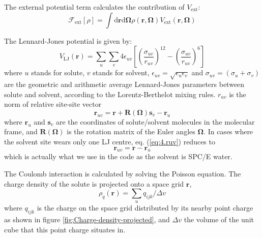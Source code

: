 The external potential term calculates the contribution of $V_{\mathrm{ext}}$:
\begin{equation}
\mathcal{F}_{\mathrm{ext}}[\rho]=\int\mathrm{d}\mathbf{r}\mathrm{d}\mathbf{\mathbf{\Omega}}\rho(\mathbf{r},\mathbf{\mathbf{\mathbf{\mathbf{\Omega}}}})V_{\mathrm{ext}}(\mathbf{r},\mathbf{\mathbf{\mathbf{\mathbf{\Omega}}}})
\end{equation}

The Lennard-Jones potential is given by:
\begin{equation}
V_{\mathrm{LJ}}(\mathbf{r})=\sum_{u}\sum_{v}4\epsilon_{uv}\left[\left(\dfrac{\sigma_{uv}}{r_{uv}}\right)^{12}-\left(\dfrac{\sigma_{uv}}{r_{uv}}\right)^{6}\right]\label{eq:4.LJ}
\end{equation}
where $u$ stands for solute, $v$ stands for solvent, $\epsilon_{uv}=\sqrt{\epsilon_{u}\epsilon_{v}}$
and $\sigma_{uv}=\left(\sigma_{u}+\sigma_{v}\right)$ are the geometric
and arithmetic average Lennard-Jones parameters between solute and
solvent, according to the Lorentz-Berthelot mixing rules. $r_{uv}$
is the norm of relative site-site vector
\begin{equation}
\mathbf{r}_{uv}=\mathbf{r}+\mathbf{R}(\mathbf{\Omega})\mathbf{s}_{v}-\mathbf{r}_{u}\label{eq:4.ruv}
\end{equation}
where $\mathbf{r}_{u}$ and $\mathbf{s}_{v}$ are the coordinates
of solute/solvent molecules in the molecular frame, and $\mathbf{R}(\mathbf{\Omega})$
is the rotation matrix of the Euler angles $\mathbf{\Omega}$. In
cases where the solvent site wears only one LJ centre, eq. (\ref{eq:4.ruv})
reduces to
\begin{equation}
\mathbf{r}_{uv}=\mathbf{r}-\mathbf{r}_{u}
\end{equation}
which is actually what we use in the code as the solvent is SPC/E
water.

The Coulomb interaction is calculated by solving the Poisson equation.
The charge density of the solute is projected onto a space grid $\mathbf{r}$,
\begin{equation}
\rho_{q}(\mathbf{r})=\sum_{u}q_{ijk}/\Delta v
\end{equation}
where $q_{ijk}$ is the charge on the space grid distributed by its
nearby point charge as shown in figure \ref{fig:Charge-density-projected},
and $\Delta v$ the volume of the unit cube that this point charge
situates in.

